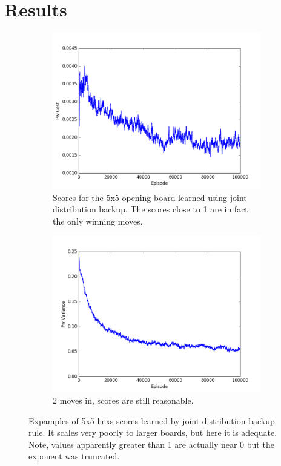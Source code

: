 \documentclass{article}
\begin{document}
\section*{Results}
\begin{figure}[!ht]
\centering
\begin{subfigure}[t]{.45\textwidth}
  \centering
      \includegraphics[width=1\textwidth]{pics/7x7_Q_Pw_cost.png}
  \caption{Scores for the 5x5 opening board learned using joint distribution backup. The scores close to 1 are in fact the only winning moves.}
  \label{fig:5x5_1}
\end{subfigure}\hfill
\begin{subfigure}[t]{.45\textwidth}
  \centering
      \includegraphics[width=1\textwidth]{pics/7x7_Q_Pw_var.png}
  \caption{2 moves in, scores are still reasonable.}
  \label{fig:5x5_2}
\end{subfigure}
\caption{Expamples of 5x5 hexs scores learned by joint distribution backup rule. It scales very poorly to larger boards, but here it is adequate. Note, values  apparently greater than 1 are actually near 0 but the exponent was truncated.}
\label{fig:5x5}
\end{figure}
\end{document}
